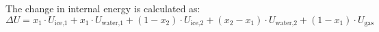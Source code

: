 The change in internal energy is calculated as:  
\[
\Delta U = x_1 \cdot U_{\text{ice,1}} + x_1 \cdot U_{\text{water,1}} + (1 - x_2) \cdot U_{\text{ice,2}} + (x_2 - x_1) \cdot U_{\text{water,2}} + (1 - x_1) \cdot U_{\text{gas}}
\]